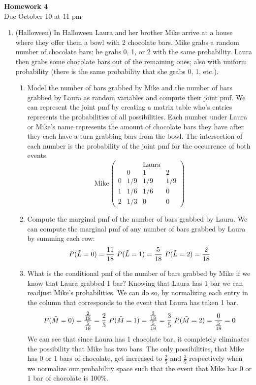 \documentclass[12pt,twoside]{article}
\begin{document}
\begin{center}
{\large{\textbf{Homework 4}} } \vspace{0.2cm}\\
Due October 10 at 11 pm
\\
\end{center}


\begin{enumerate}

\item (Halloween) In Halloween Laura and her brother Mike arrive at a house where they offer them a bowl with 2 chocolate bars. Mike grabs a random number of chocolate bars; he grabs 0, 1, or 2 with the same probability. Laura then grabs some chocolate bars out of the remaining ones; also with uniform probability (there is the same probability that she grabs 0, 1, etc.).
\begin{enumerate}
\item Model the number of bars grabbed by Mike and the number of bars grabbed by Laura as random variables and compute their joint pmf.
\subitem 
We can represent the joint pmf by creating a matrix table who's entries represents the probabilities of all possibilities. Each number under Laura or Mike's name represents the amount of chocolate bars they have after they each have a turn grabbing bars from the bowl. The intersection of each number is the probability of the joint pmf for the occurrence of both events. 
$$
    \text{Mike}
    \begin{pmatrix}
    \ & \ & \text{Laura} & \ \\
    \ & 0 & 1 & 2 \\
    0 & 1/9 & 1/9 & 1/9 \\
    1 & 1/6 & 1/6 & 0 \\
    2 & 1/3 & 0 & 0
    \end{pmatrix}
$$

\item Compute the marginal pmf of the number of bars grabbed by Laura. 
\subitem We can compute the marginal pmf of any number of bars grabbed by Laura by summing each row:
$$
    P(\Tilde{L}=0) = \frac{11}{18} \  P(\Tilde{L}=1) = \frac{5}{18} \ P(\Tilde{L}=2) = \frac{2}{18}
$$
\item What is the conditional pmf of the number of bars grabbed by Mike if we know that Laura grabbed 1 bar?
\subitem Knowing that Laura has 1 bar we can readjust Mike's probabilities. We can do so, by normalizing each entry in the column that corresponds to the event that Laura has taken 1 bar.
$$
    P(\Tilde{M}=0) = \frac{\frac{2}{18}}{\frac{5}{18}} = \frac{2}{5} \  P(\Tilde{M}=1) = \frac{\frac{3}{18}}{\frac{5}{18}} = \frac{3}{5} \ P(\Tilde{M}=2) = \frac{0}{\frac{5}{18}} = 0
$$
We can see that since Laura has 1 chocolate bar, it completely eliminates the possibility that Mike has two bars. The only possibilities, that Mike has 0 or 1 bars of chocolate, get increased to $\frac{2}{5}$ and $\frac{3}{5}$ respectively when we normalize our probability space such that the event that Mike has 0 or 1 bar of chocolate is 100$\%$.
\end{enumerate}


\end{enumerate}
\end{document}
